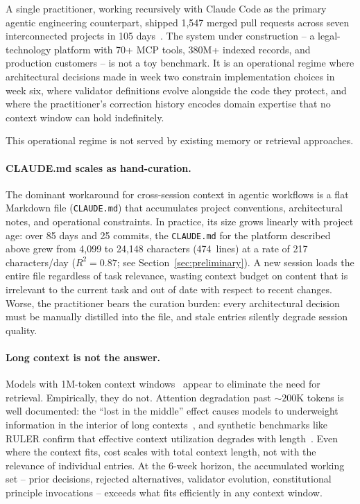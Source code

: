 \documentclass[11pt]{article}
\begin{document}
A single practitioner, working recursively with Claude Code as the primary agentic engineering counterpart, shipped 1{,}547 merged pull requests across seven interconnected projects in 105 days~\citep[\S1]{ovcharov2026recursive}.
The system under construction -- a legal-technology platform with 70+ MCP tools, 380M+ indexed records, and production customers -- is not a toy benchmark.
It is an operational regime where architectural decisions made in week two constrain implementation choices in week six, where validator definitions evolve alongside the code they protect, and where the practitioner's correction history encodes domain expertise that no context window can hold indefinitely.

This operational regime is not served by existing memory or retrieval approaches.

\paragraph{CLAUDE.md scales as hand-curation.}
The dominant workaround for cross-session context in agentic workflows is a flat Markdown file (\texttt{CLAUDE.md}) that accumulates project conventions, architectural notes, and operational constraints.
In practice, its size grows linearly with project age: over 85 days and 25 commits, the \texttt{CLAUDE.md} for the platform described above grew from 4{,}099 to 24{,}148 characters (474~lines) at a rate of 217 characters/day ($R^2 = 0.87$; see Section~\ref{sec:preliminary}).
A new session loads the entire file regardless of task relevance, wasting context budget on content that is irrelevant to the current task and out of date with respect to recent changes.
Worse, the practitioner bears the curation burden: every architectural decision must be manually distilled into the file, and stale entries silently degrade session quality.

\paragraph{Long context is not the answer.}
Models with 1M-token context windows~\citep{reid2024gemini} appear to eliminate the need for retrieval.
Empirically, they do not.
Attention degradation past ${\sim}200$K tokens is well documented: the ``lost in the middle'' effect causes models to underweight information in the interior of long contexts~\citep{liu2023lost}, and synthetic benchmarks like RULER confirm that effective context utilization degrades with length~\citep{hsieh2024ruler}.
Even where the context fits, cost scales with total context length, not with the relevance of individual entries.
At the 6-week horizon, the accumulated working set -- prior decisions, rejected alternatives, validator evolution, constitutional principle invocations -- exceeds what fits efficiently in any context window.
\end{document}
